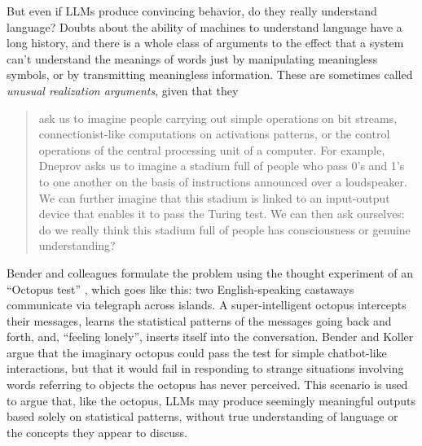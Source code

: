 But even if LLMs produce convincing behavior, do they really understand language? Doubts about the ability of machines to understand language have a long history, and there is a whole class of arguments to the effect that a system can’t understand the meanings of words just by manipulating meaningless symbols, or by transmitting meaningless information. These are sometimes called \emph{unusual realization arguments}, given that they
\begin{quote}
ask us to imagine people carrying out simple operations on bit streams, connectionist-like computations on activations patterns, or the control operations of the central processing unit of a computer. For example, Dneprov asks us to imagine a stadium full of people who pass 0’s and 1’s to one another on the basis of instructions announced over a loudspeaker. We can further imagine that this stadium is linked to an input-output device that enables it to pass the Turing test. We can then ask ourselves: do we really think this stadium full of people has consciousness or genuine understanding? \cite{noelle2022artificial}
\end{quote}

 
 Bender and colleagues formulate the problem using the thought experiment of an ``Octopus test'' \cite{bender2020climbing}, which goes like this: two English-speaking castaways communicate via telegraph across islands. A super-intelligent octopus intercepts their messages, learns the statistical patterns of the messages going back and forth, and, ``feeling lonely'', inserts itself into the conversation. Bender and Koller argue that the imaginary octopus could pass the test for simple chatbot-like interactions, but that it would fail in responding to strange situations involving words referring to objects the octopus has never perceived. This scenario is used to argue that, like the octopus, LLMs may produce seemingly meaningful outputs based solely on statistical patterns, without true understanding of language or the concepts they appear to discuss.


